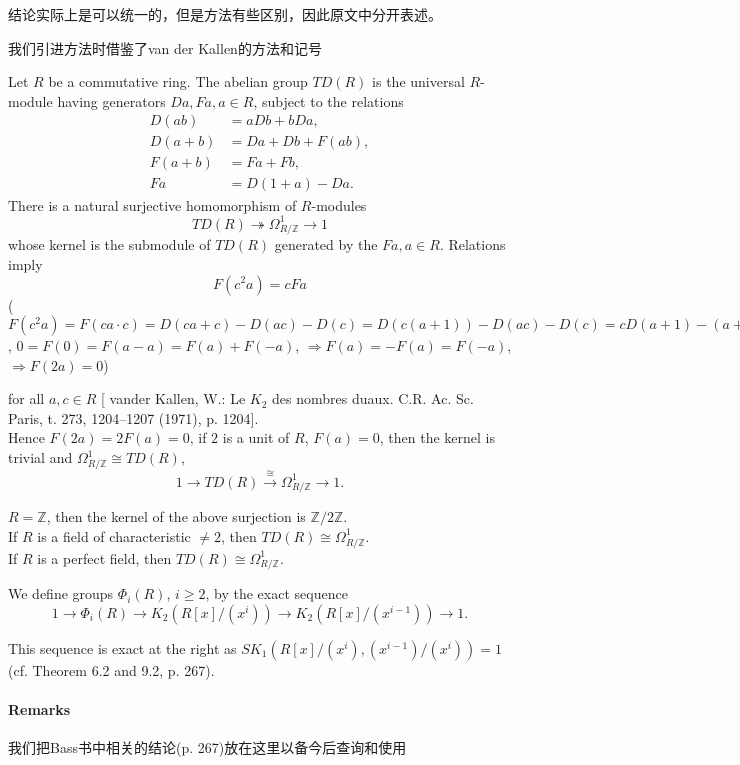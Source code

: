 结论实际上是可以统一的，但是方法有些区别，因此原文中分开表述。

我们引进方法时借鉴了van der Kallen的方法和记号

Let $R$ be a commutative ring. The abelian group  $TD(R)$  is the universal $R$-module having generators  $Da, Fa, a \in R$,  subject to the relations
\begin{align*}
D(ab) &= aDb + bDa,\\
D(a + b) &= Da + Db + F(ab),\\
F(a + b) &= Fa + Fb,\\
Fa  &= D(1  + a)- Da.
\end{align*}
There is a natural surjective homomorphism of $R$-modules
\[TD(R)\twoheadrightarrow \Omega^1_{R/\mathbb{Z}}\longrightarrow 1\]
whose kernel is the submodule of  $TD(R)$  generated by the  $Fa, a\in R$.  Relations
imply
\[
F(c^2a)=cFa
\]
($F(c^2a)=F(ca\cdot c)=D(ca+c)-D(ac)-D(c)=D(c(a+1))-D(ac)-D(c)=cD(a+1)-(a+1)D(c)-aD(c)-cD(a)-D(c)=cF(a)$, $0=F(0)=F(a-a)=F(a)+F(-a)$, $\Rightarrow F(a)=-F(a)=F(-a)$, $\Rightarrow F(2a)=0$)

for all  $a, c \in R$  [ vander Kallen, W.: Le $K_2$ des nombres duaux. C.R. Ac. Sc. Paris, t. 273, 1204--1207 (1971), p. 1204]. \\
Hence $F(2a)=2F(a)=0$, if $2$ is a unit of $R$, $F(a)=0$, then the kernel is trivial and $\Omega^1_{R/\mathbb{Z}}\cong  TD(R)$,
\[1\longrightarrow TD(R)\overset{\cong}\longrightarrow \Omega^1_{R/\mathbb{Z}}\longrightarrow 1.\]  
\begin{example}
	$R=\mathbb{Z}$, then the kernel of the above surjection is $\mathbb{Z}/2\mathbb{Z}$.\\
	If $R$ is a field of characteristic $\neq 2$, then $TD(R)\cong \Omega^1_{R/\mathbb{Z}}$.\\
	If $R$ is a perfect field, then $TD(R)\cong \Omega^1_{R/\mathbb{Z}}$.
\end{example}
\begin{definition}
	We define groups  $\Phi_i(R)$, $i\geq 2$, by the exact sequence
	\[1 \longrightarrow \Phi_i(R) \longrightarrow K_2 (R[x]/(x^i))  \longrightarrow K_2(R[x]/(x^{i-1})) \longrightarrow 1. \]
\end{definition}
This sequence is exact at the right as  $SK_1(R[x]/(x^i), (x^{i-1})/(x^i))=  1$ (cf. \cite{MR50:2304} Theorem 6.2 and \cite{MR40:2736}9.2, p. 267).
\paragraph{Remarks} %
\label{par:remarks}我们把Bass书\cite{MR40:2736}中相关的结论(p. 267)放在这里以备今后查询和使用

